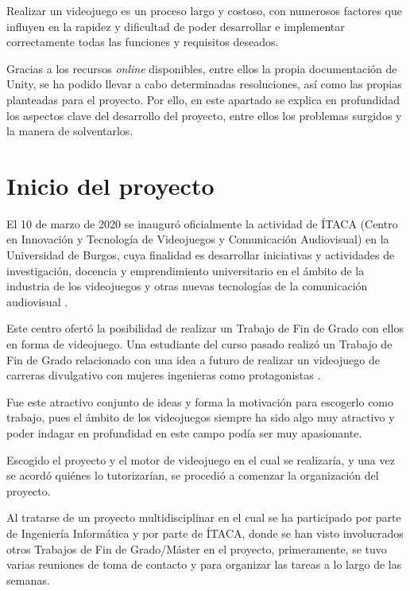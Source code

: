 \label{cap:aspectos}
Realizar un videojuego es un proceso largo y costoso, con numerosos factores que influyen en la rapidez y dificultad de poder desarrollar e implementar correctamente todas las funciones y requisitos deseados.

Gracias a los recursos \textit{online} disponibles, entre ellos la propia documentación de Unity, se ha podido llevar a cabo determinadas resoluciones, así como las propias planteadas para el proyecto. Por ello, en este apartado se explica en profundidad los aspectos clave del desarrollo del proyecto, entre ellos los problemas surgidos y la manera de solventarlos.

\section{Inicio del proyecto}

El 10 de marzo de 2020 se inauguró oficialmente la actividad de ÍTACA (Centro en Innovación y Tecnología de Videojuegos y Comunicación Audiovisual) en la Universidad de Burgos, cuya finalidad es desarrollar iniciativas y actividades de investigación, docencia y emprendimiento universitario en el ámbito de la industria de los videojuegos y otras nuevas tecnologías de la comunicación audiovisual \cite{itaca}.

Este centro ofertó la posibilidad de realizar un Trabajo de Fin de Grado con ellos en forma de videojuego. Una estudiante del curso pasado realizó un Trabajo de Fin de Grado relacionado con una idea a futuro de realizar un videojuego de carreras divulgativo con mujeres ingenieras como protagonistas \cite{itaca:tfg}. 

Fue este atractivo conjunto de ideas y forma la motivación para escogerlo como trabajo, pues el ámbito de los videojuegos siempre ha sido algo muy atractivo y poder indagar en profundidad en este campo podía ser muy apasionante.

Escogido el proyecto y el motor de videojuego en el cual se realizaría, y una vez se acordó quiénes lo tutorizarían, se procedió a comenzar la organización del proyecto.

Al tratarse de un proyecto multidisciplinar en el cual se ha participado por parte de Ingeniería Informática y por parte de ÍTACA, donde se han visto involucrados otros Trabajos de Fin de Grado/Máster en el proyecto, primeramente, se tuvo varias reuniones de toma de contacto y para organizar las tareas a lo largo de las semanas.

